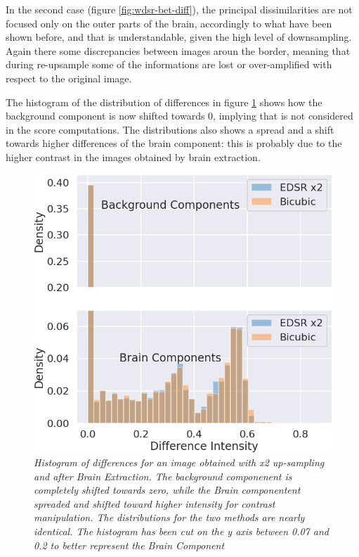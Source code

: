 \documentclass[12pt,a4paper]{report}
\begin{document}
In the second case (figure \ref{fig:wdsr-bet-diff}), the principal dissimilarities are not focused only on the outer parts of the brain, accordingly to what have been shown before, and that is understandable, given the high level of downsampling. 
Again there some discrepancies between images aroun the border, meaning that during re-upsample some of the informations are lost or over-amplified with respect to the original image.  

The histogram of the distribution of differences in figure \ref{fig:histo-bet-edsr} shows how the background component is now shifted towards 0, implying that is not considered in the score computations. 
The distributions also shows a spread and a shift towards higher differences of the brain component: this is probably due to the higher contrast in the images obtained by brain extraction.

\begin{figure}[H]
 \centering
 \includegraphics[scale=0.4]{./images/histo_bet_edsr.png}
 \caption{\it Histogram of differences for an image obtained with x2 up-sampling and after Brain Extraction. The background componenent is completely shifted towards zero, while the Brain componentent spreaded and shifted toward higher intensity for contrast manipulation. The distributions for the two methods are nearly identical. The histogram has been cut on the y axis between 0.07 and 0.2 to better represent the Brain Component}
 \label{fig:histo-bet-edsr}
\end{figure}
\end{document}
